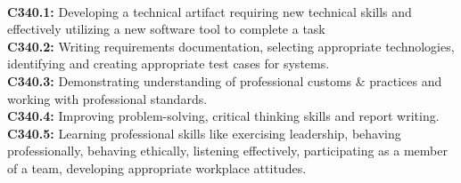 \newcommand{\normal}{\fontsize{12pt}{16pt}\selectfont}
\newcommand{\size}{\fontsize{14pt}{18pt}\selectfont}
\newcommand{\bigsize}{\fontsize{16pt}{20pt}\selectfont}
\newcommand{\bigbigsize}{\fontsize{20pt}{24pt}\selectfont}
\begin{flushleft}
\textbf{\size{Course Outcomes(COs)}}
\end{flushleft}
\\
\textbf{C340.1:} Developing a technical artifact requiring new technical skills and effectively utilizing a  new software tool to complete a task \\ 
\textbf{C340.2:} 
Writing requirements documentation, selecting appropriate technologies, identifying and creating appropriate test cases for systems. \\ 
\textbf{C340.3:} 
Demonstrating understanding of professional customs \& practices and  working with professional standards.\\
\textbf{C340.4:} 
  Improving problem-solving, critical thinking skills and report writing. \\ 
\textbf{C340.5:} 
Learning professional skills like exercising leadership, behaving professionally, behaving ethically, listening effectively, participating as a member of a team, developing appropriate workplace attitudes.\ \\ 



